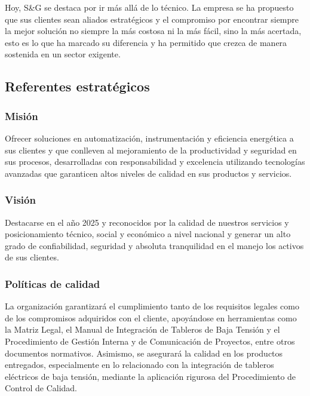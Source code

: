 Hoy, S\&G se destaca por ir más allá de lo técnico. La empresa se ha propuesto que sus clientes sean aliados estratégicos y el compromiso por encontrar siempre la mejor solución no siempre la más costosa ni la más fácil, sino la más acertada, esto es lo que ha marcado su diferencia y ha permitido que crezca de manera sostenida en un sector exigente.

\subsection{Referentes estratégicos}
\subsubsection{Misión}
Ofrecer soluciones en automatización, instrumentación y eficiencia energética a sus clientes y que conlleven al mejoramiento de la productividad y seguridad en sus procesos, desarrolladas con responsabilidad y excelencia utilizando tecnologías avanzadas que garanticen altos niveles de calidad en sus productos y servicios.

\subsubsection{Visión}
Destacarse en el año 2025 y reconocidos por la calidad de nuestros servicios y posicionamiento técnico, social y económico a nivel nacional y generar un alto grado de confiabilidad, seguridad y absoluta tranquilidad en el manejo los activos de sus clientes.

\subsubsection{Políticas de calidad}
La organización garantizará el cumplimiento tanto de los requisitos legales como de los compromisos adquiridos con el cliente, apoyándose en herramientas como la Matriz Legal, el Manual de Integración de Tableros de Baja Tensión y el Procedimiento de Gestión Interna y de Comunicación de Proyectos, entre otros documentos normativos. Asimismo, se asegurará la calidad en los productos entregados, especialmente en lo relacionado con la integración de tableros eléctricos de baja tensión, mediante la aplicación rigurosa del Procedimiento de Control de Calidad.

